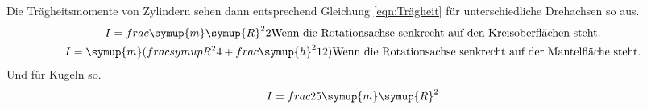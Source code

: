 Die Trägheitsmomente von Zylindern sehen dann entsprechend Gleichung \ref{eqn:Trägheit} für unterschiedliche
Drehachsen so aus.
\begin{equation}
    \begin{gather}
        I=frac{\symup{m}\symup{R}^2}{2} \text{Wenn die Rotationsachse senkrecht auf den Kreisoberflächen steht.}
        \label{eqn:Trägheit_Zyl_1}
        \\
        I=\symup{m} (frac{symup{R}^2}{4}+frac{\symup{h}^2}{12}) \text{Wenn die Rotationsachse senkrecht auf der Mantelfläche steht.}
        \label{eqn:Trägheit_Zyl_2}
    \end{gather}
\end{equation}
Und für Kugeln so.
\begin{equation}
    I=frac{2}{5}\symup{m}\symup{R}^2
    \label{eqn:Trägheit_Kugel}
\end{equation}
\cite{sample}
